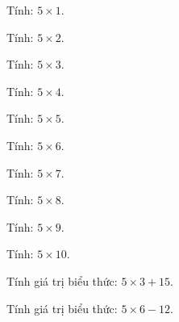 \begin{ex}
Tính: $5 \times 1$.
\end{ex}

\begin{ex}
Tính: $5 \times 2$.
\end{ex}

\begin{ex}
Tính: $5 \times 3$.
\end{ex}

\begin{ex}
Tính: $5 \times 4$.
\end{ex}

\begin{ex}
Tính: $5 \times 5$.
\end{ex}

\begin{ex}
Tính: $5 \times 6$.
\end{ex}

\begin{ex}
Tính: $5 \times 7$.
\end{ex}

\begin{ex}
Tính: $5 \times 8$.
\end{ex}

\begin{ex}
Tính: $5 \times 9$.
\end{ex}

\begin{ex}
Tính: $5 \times 10$.
\end{ex}

\begin{ex}
Tính giá trị biểu thức: $5 \times 3 + 15$.
\end{ex}

\begin{ex}
Tính giá trị biểu thức: $5 \times 6 - 12$.
\end{ex}

